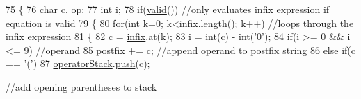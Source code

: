 \begin{DoxyCode}
75 \{
76    \textcolor{keywordtype}{char} c, op;
77    \textcolor{keywordtype}{int} i;
78    \textcolor{keywordflow}{if}(\hyperlink{classAlgebraicExpression_aa3c08af8a2b4d67c356f3cf69b2f6bc6}{valid}()) \textcolor{comment}{//only evaluates infix expression if equation is valid                                 
                                                                                                            }
79    \{
80       \textcolor{keywordflow}{for}(\textcolor{keywordtype}{int} k=0; k<\hyperlink{classAlgebraicExpression_ac9a5d8af4bd13370e7f2cb66b0f1daa2}{infix}.length(); k++) \textcolor{comment}{//loops through the infix expression                        
                                                                                                            }
81       \{
82          c = \hyperlink{classAlgebraicExpression_ac9a5d8af4bd13370e7f2cb66b0f1daa2}{infix}.at(k);
83          i = int(c) - int(\textcolor{charliteral}{'0'});
84          \textcolor{keywordflow}{if}(i >= 0 && i <= 9) \textcolor{comment}{//operand                                                                    
                                                                                                       }
85             \hyperlink{classAlgebraicExpression_a0c9827f84bf13c0f0f4a096e72462a44}{postfix} += c; \textcolor{comment}{//append operand to postfix string                                        
                                                                                                              }
86          \textcolor{keywordflow}{else} \textcolor{keywordflow}{if}(c == \textcolor{charliteral}{'('})
87             \hyperlink{classAlgebraicExpression_a863ef1cc73b9b3b49c199f1564cbcc2e}{operatorStack}.\hyperlink{classStack_a3553a0aa2c9640c5266e4d8790863e2e}{push}(c); \textcolor{comment}{//add opening parentheses to stack                     
                                                                                                                  
}
\end{DoxyCode}
